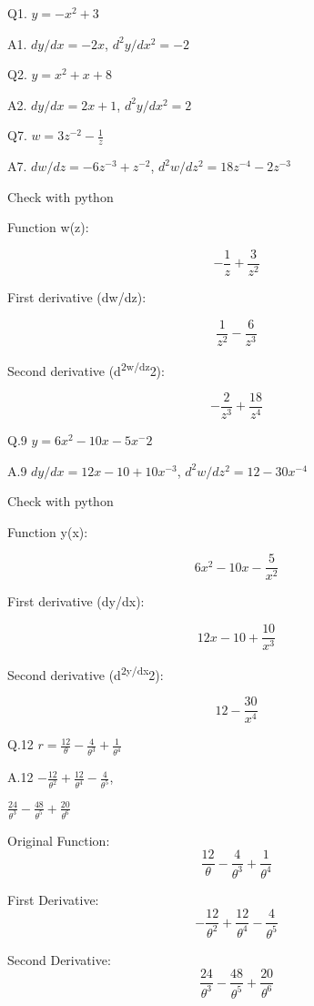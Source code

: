 \documentclass[
  letterpaper,
  DIV=11,
  numbers=noendperiod]{scrartcl}
\begin{document}
Q1. \(y = -x^2 + 3\)

A1. \(dy/dx = -2x\), \(d^2y/dx^2 = -2\)

Q2. \(y = x^2 + x + 8\)

A2. \(dy/dx = 2x + 1\), \(d^2y/dx^2 = 2\)

Q7. \(w = 3z^{-2} - \frac{1}{z}\)

A7. \(dw/dz = -6z^{-3}+z^{-2}\), \(d^2w/dz^2 = 18z^{-4}-2z^{-3}\)

Check with python

Function w(z):

\[- \frac{1}{z} + \frac{3}{z^{2}}\]

First derivative (dw/dz):

\[\frac{1}{z^{2}} - \frac{6}{z^{3}}\]

Second derivative (d\textsuperscript{2w/dz}2):

\[- \frac{2}{z^{3}} + \frac{18}{z^{4}}\]

Q.9 \(y=6x^2-10x-5x^-2\)

A.9 \(dy/dx = 12x - 10 +10x^{-3}\), \(d^2w/dz^2 = 12-30x^{-4}\)

Check with python

Function y(x):

\[6 x^{2} - 10 x - \frac{5}{x^{2}}\]

First derivative (dy/dx):

\[12 x - 10 + \frac{10}{x^{3}}\]

Second derivative (d\textsuperscript{2y/dx}2):

\[12 - \frac{30}{x^{4}}\]

Q.12 \(r = \frac{12}{\theta} - \frac{4}{\theta^3} + \frac{1}{\theta^4}\)

A.12
\(- \frac{12}{\theta^{2}} + \frac{12}{\theta^{4}} - \frac{4}{\theta^{5}}\),

\(\frac{24}{\theta^{3}} - \frac{48}{\theta^{5}} + \frac{20}{\theta^{6}}\)

Original Function:
\[\frac{12}{\theta} - \frac{4}{\theta^{3}} + \frac{1}{\theta^{4}}\]

First Derivative:
\[- \frac{12}{\theta^{2}} + \frac{12}{\theta^{4}} - \frac{4}{\theta^{5}}\]

Second Derivative:
\[\frac{24}{\theta^{3}} - \frac{48}{\theta^{5}} + \frac{20}{\theta^{6}}\]

\begin{verbatim}
\end{verbatim}
\end{document}
